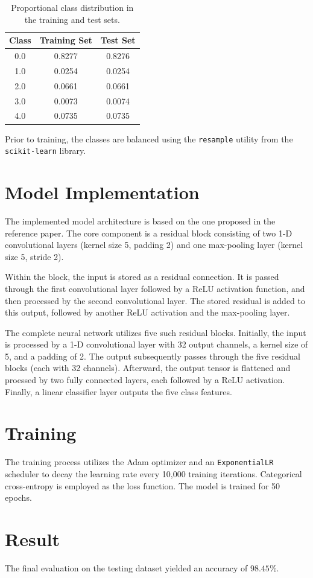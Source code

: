 \documentclass[conference]{IEEEtran}
\begin{document}
\begin{table}[h]
	\centering
	\begin{tabular}{ccc}
		\hline
		\textbf{Class} & \textbf{Training Set} & \textbf{Test Set} \\
		\hline
		0.0 & 0.8277 & 0.8276 \\
		1.0 & 0.0254 & 0.0254 \\
		2.0 & 0.0661 & 0.0661 \\
		3.0 & 0.0073 & 0.0074 \\
		4.0 & 0.0735 & 0.0735 \\
		\hline
	\end{tabular}
	\caption{Proportional class distribution in the training and test sets.}
	\label{tab:class_distribution}
\end{table}

Prior to training, the classes are balanced using the \texttt{resample} utility from the \texttt{scikit-learn} library.

\section{Model Implementation}

The implemented model architecture is based on the one proposed in the reference paper. The core component is a residual block consisting of two 1-D convolutional layers (kernel size 5, padding 2) and one max-pooling layer (kernel size 5, stride 2).

Within the block, the input is stored as a residual connection. It is passed through the first convolutional layer followed by a ReLU activation function, and then processed by the second convolutional layer. The stored residual is added to this output, followed by another ReLU activation and the max-pooling layer.

The complete neural network utilizes five such residual blocks. Initially, the input is processed by a 1-D convolutional layer with 32 output channels, a kernel size of 5, and a padding of 2. The output subsequently passes through the five residual blocks (each with 32 channels). Afterward, the output tensor is flattened and proessed by two fully connected layers, each followed by a ReLU activation. Finally, a linear classifier layer outputs the five class features.

\section{Training}

The training process utilizes the Adam optimizer and an \texttt{ExponentialLR} scheduler to decay the learning rate every 10,000 training iterations. Categorical cross-entropy is employed as the loss function. The model is trained for 50 epochs.

\section{Result}

The final evaluation on the testing dataset yielded an accuracy of $98.45\%$.
\end{document}
